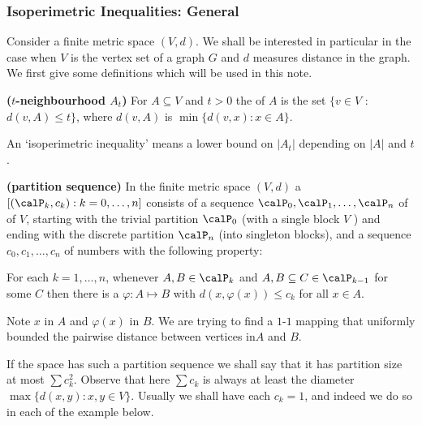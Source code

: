 \documentclass{article}
\newcommand{\bfs}[1]{\textbf{({#1})}}
\begin{document}
\subsubsection{Isoperimetric Inequalities: General}
Consider a finite metric space $( V , d ) .$ We shall be interested in
particular in the case when $V$ is the vertex set of a graph $G$ and $d$ measures
distance in the graph. We first give some definitions which will be used in this note.
\begin{defa}{\bfs{$t$-neighbourhood  $A_{t}$}}
For $A \subseteq V$ and $t>0$ the   of $A$ is the set $\{v \in V$ :
$d ( v , A ) \leq t \}$, where $d ( v , A )$ is  $\min \{ d ( v , x ): x \in A \}$.
\end{defa}
\begin{rema}
An `isoperimetric inequality' means a lower bound on $\left|A_{t}\right|$ depending on $|A|$ and $t$. 
\end{rema}
\begin{defa}{\bfs{partition sequence}}
In the finite metric space $(V, d )$ a  $\left[\left( \calP_k , c _{ k }\right): k =0, \ldots, n \right]$ consists of a sequence $\calP_{0}, \calP_{1}, \ldots, \calP_{ n }$ of  of $V$, starting with the trivial partition $\calP_{0}$ (with a single block $V$ ) and ending with the discrete partition $\calP_{ n }$ (into singleton blocks), and a sequence $c_{0}, c_{1}, \ldots, c_{n}$ of numbers with the following property: 

For each $k =1, \ldots, n$, whenever $A , B \in \calP_{k}$ and $A , B \subseteq C \in \calP_{k -1}$ for some $C$ then there is a  $\varphi: A \mapsto B$ with $d ( x , \varphi( x )) \leq c_{ k }$ for all $x \in A .$
\end{defa}
\begin{rema}
Note $x$ in $A$ and $\varphi(x)$ in $B$. We are trying to find a $1$-$1$ mapping that uniformly bounded the pairwise distance between vertices in$A$ and $B$.
\end{rema}
\begin{rema}
If the space has such a partition sequence we shall say that it has partition size at most $\sum c_{k}^{2} .$ Observe that here $\sum c_{k}$ is always at least the diameter $\max \{ d ( x , y ): x , y \in V \} .$ Usually we shall have each $c_{ k }=1$, and indeed we do so in each of the example below.
\end{rema}
\end{document}
